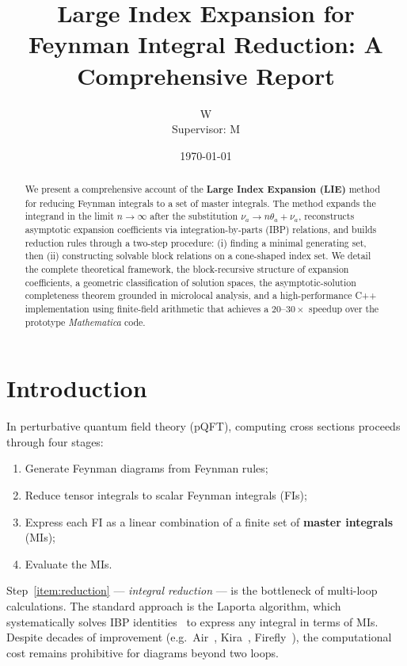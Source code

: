 \documentclass[12pt]{article}
\title{Large Index Expansion for Feynman Integral Reduction: A Comprehensive Report}
\author{W \\
  Supervisor: M}
\date{\today}
\begin{document}
\maketitle

\begin{abstract}
  We present a comprehensive account of the \textbf{Large Index Expansion (LIE)} method
  for reducing Feynman integrals to a set of master integrals.
  The method expands the integrand in the limit $n\to\infty$ after the substitution
  $\nu_a\to n\theta_a+\nu_a$, reconstructs asymptotic expansion coefficients via
  integration-by-parts (IBP) relations, and builds reduction rules through a
  two-step procedure: (i) finding a minimal generating set, then (ii) constructing
  solvable block relations on a cone-shaped index set.
  We detail the complete theoretical framework, the block-recursive structure of
  expansion coefficients, a geometric classification of solution spaces, the
  asymptotic-solution completeness theorem grounded in microlocal analysis, and a
  high-performance C++ implementation using finite-field arithmetic that achieves a
  $20$--$30\times$ speedup over the prototype \emph{Mathematica} code.
\end{abstract}

\section{Introduction}\label{sec:intro}

In perturbative quantum field theory (pQFT), computing cross sections proceeds through
four stages:
\begin{enumerate}
  \item Generate Feynman diagrams from Feynman rules;
  \item Reduce tensor integrals to scalar Feynman integrals (FIs);
  \item Express each FI as a linear combination of a finite set of \textbf{master integrals} (MIs);
        \label{item:reduction}
  \item Evaluate the MIs.
\end{enumerate}
Step~\ref{item:reduction} --- \emph{integral reduction} --- is the bottleneck of
multi-loop calculations.  The standard approach is the Laporta algorithm, which
  systematically solves IBP identities~\cite{Chetyrkin:1981qh,Laporta:2001dd} to express
  any integral in terms of MIs.  Despite decades of improvement
  (e.g.\ Air~\cite{vonManteuffel:2012np}, Kira~\cite{Kira:2021dvi},
  Firefly~\cite{Wallet:2023aa}), the computational cost
remains prohibitive for diagrams beyond two loops.
\end{document}

